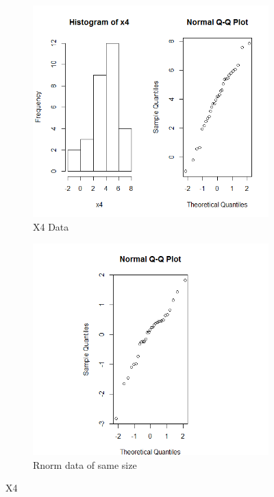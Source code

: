 \documentclass{article}
\begin{document}
    \begin{figure}
    \begin{subfigure}{.5\textwidth}
      \centering
      \includegraphics[width=.8\linewidth]{results/X4}
      \caption{X4 Data}
    \end{subfigure}
    \begin{subfigure}{.5\textwidth}
      \centering
      \includegraphics[width=.8\linewidth]{results/X4_2}
      \caption{Rnorm data of same size}
    \end{subfigure}
    \caption{X4}
    \label{fig:X4}
    \end{figure}
\end{document}
